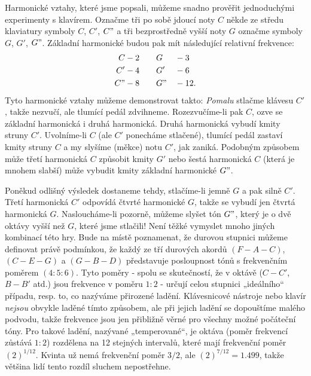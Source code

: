   Harmonické vztahy, které jsme popsali, můžeme snadno prověřit jednoduchými experimenty s 
  klavírem. Označme tři po sobě jdoucí noty \(C\) někde ze středu klaviatury symboly \(C\), \(C'\), 
  \(C"\) a tři bezprostředně vyšší noty \(G\) označme symboly \(G\), \(G'\), \(G"\). Základní 
  harmonické budou pak mít následující relativní frekvence:
  \begin{alignat*}{2}
    C  &-2 \qquad G  &&-3    \\
    C' &-4 \qquad G' &&-6    \\
    C" &-8 \qquad G" &&-12.  
  \end{alignat*}
  Tyto harmonické vztahy můžeme demonstrovat takto: \emph{Pomalu} stlačme klávesu \(C'\), takže 
  nezvučí, ale tlumící pedál zdvihneme. Rozezvučíme-li pak \(C\), ozve se základní harmonická i 
  druhá harmonická. Druhá harmonická vybudí kmity struny \(C'\). Uvolníme-li \(C\) (ale \(C'\) 
  ponecháme stlačené), tlumící pedál zastaví kmity struny \(C\) a my slyšíme (měkce) notu \(C'\), 
  jak zaniká. Podobným způsobem může třetí harmonická \(C\) způsobit kmity \(G'\) nebo šestá 
  harmonická \(C\) (která je mnohem slabší) může vybudit kmity základní harmonické \(G"\). 
  
  Poněkud odlišný výsledek dostaneme tehdy, stlačíme-li jemně \(G\) a pak silně \(C'\). Třetí 
  harmonická \(C'\) odpovídá čtvrté harmonické \(G\), takže se vybudí jen čtvrtá harmonická 
  \(G\). Nasloucháme-li pozorně, můžeme slyšet tón \(G"\), který je o dvě oktávy vyšší než \(G\), 
  které jsme stlačili! Není těžké vymyslet mnoho jiných kombinací této hry. Bude na místě 
  poznamenat, že durovou stupnici můžeme definovat právě podmínkou, že každý ze tří durových akordů 
  \((F-A-C)\), \((C-E-G)\) a \((G-B-D)\) představuje posloupnost tónů s frekvenčním poměrem \((4: 
  5:6)\). Tyto poměry - spolu se skutečností, že v oktávě (\(C-C'\), \(B-B'\) atd.) jsou frekvence 
  v poměru \(1:2\) - určují celou stupnici „ideálního“ případu, resp. to, co nazýváme přirozené 
  ladění. Klávesnicové nástroje nebo klavír \emph{nejsou} obvykle laděné tímto způsobem, ale při 
  jejich ladění se dopouštíme malého podvodu, takže frekvence jsou jen přibližně věrné pro všechny 
  možné počáteční tóny. Pro takové ladění, nazývané „temperované“, je oktáva (poměr frekvencí 
  zůstává \(1:2\)) rozdělena na \num{12} stejných intervalů, které mají frekvenční poměr 
  \((2)^{1/12}\). Kvinta už nemá frekvenční poměr \(3/2\), ale \((2)^{7/12} = \num{1.499}\), takže 
  většina lidí tento rozdíl sluchem nepostřehne.
  
